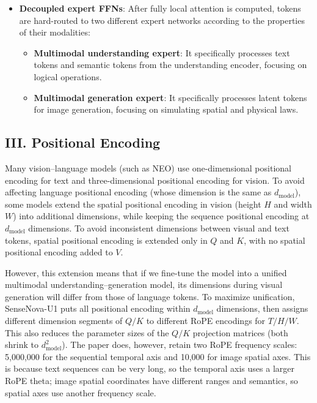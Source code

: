 \begin{itemize}
\tightlist
\item
{}
  \textbf{Decoupled expert FFNs}: After fully local attention is computed, tokens are hard-routed to two different expert networks according to the properties of their modalities:

  \begin{itemize}
  \tightlist
  \item
    \textbf{Multimodal understanding expert}: It specifically processes text tokens and semantic tokens from the understanding encoder, focusing on logical operations.
  \item
    \textbf{Multimodal generation expert}: It specifically processes latent tokens for image generation, focusing on simulating spatial and physical laws.
  \end{itemize}
\end{itemize}

\hypertarget{iii.-positional-encoding}{%
\subsection{III. Positional Encoding}\label{iii.-positional-encoding}}

Many vision--language models (such as NEO) use one-dimensional positional encoding for text and three-dimensional positional encoding for vision. To avoid affecting language positional encoding (whose dimension is the same as \(d_{\mathrm{model}}\)), some models extend the spatial positional encoding in vision (height \(H\) and width \(W\)) into additional dimensions, while keeping the sequence positional encoding at \(d_{\mathrm{model}}\) dimensions. To avoid inconsistent dimensions between visual and text tokens, spatial positional encoding is extended only in \(Q\) and \(K\), with no spatial positional encoding added to \(V\).

However, this extension means that if we fine-tune the model into a unified multimodal understanding--generation model, its dimensions during visual generation will differ from those of language tokens. To maximize unification, SenseNova-U1 puts all positional encoding within \(d_{\mathrm{model}}\) dimensions, then assigns different dimension segments of \(Q/K\) to different RoPE encodings for \(T/H/W\). This also reduces the parameter sizes of the \(Q/K\) projection matrices (both shrink to \(d_{\mathrm{model}}^2\)). The paper does, however, retain two RoPE frequency scales: 5,000,000 for the sequential temporal axis and 10,000 for image spatial axes. This is because text sequences can be very long, so the temporal axis uses a larger RoPE theta; image spatial coordinates have different ranges and semantics, so spatial axes use another frequency scale.

